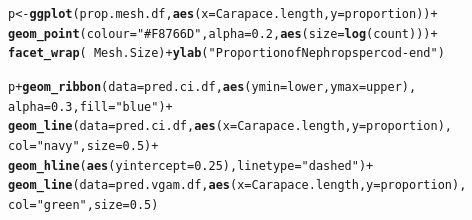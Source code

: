 \documentclass[12pt]{article}\usepackage[]{graphicx}\usepackage[]{color}
\makeatletter
\newcommand{\hlnum}[1]{\textcolor[rgb]{0.686,0.059,0.569}{#1}}%
\newcommand{\hlstr}[1]{\textcolor[rgb]{0.192,0.494,0.8}{#1}}%
\newcommand{\hlopt}[1]{\textcolor[rgb]{0,0,0}{#1}}%
\newcommand{\hlstd}[1]{\textcolor[rgb]{0.345,0.345,0.345}{#1}}%
\newcommand{\hlkwb}[1]{\textcolor[rgb]{0.69,0.353,0.396}{#1}}%
\newcommand{\hlkwc}[1]{\textcolor[rgb]{0.333,0.667,0.333}{#1}}%
\newcommand{\hlkwd}[1]{\textcolor[rgb]{0.737,0.353,0.396}{\textbf{#1}}}%
\newenvironment{kframe}{%
 \def\at@end@of@kframe{}%
 \ifinner\ifhmode%
  \def\at@end@of@kframe{\end{minipage}}%
  \begin{minipage}{\columnwidth}%
 \fi\fi%
 \def\FrameCommand##1{\hskip\@totalleftmargin \hskip-\fboxsep
 \colorbox{shadecolor}{##1}\hskip-\fboxsep
     \hskip-\linewidth \hskip-\@totalleftmargin \hskip\columnwidth}%
 \MakeFramed {\advance\hsize-\width
   \@totalleftmargin\z@ \linewidth\hsize
   \@setminipage}}%
 {\par\unskip\endMakeFramed%
 \at@end@of@kframe}
\newenvironment{knitrout}{}{} %
\makeatother
\begin{document}
\begin{knitrout}\footnotesize
{}\color{fgcolor}\begin{kframe}
\begin{alltt}
\hlstd{p} \hlkwb{<-} \hlkwd{ggplot}\hlstd{(prop.mesh.df,} \hlkwd{aes}\hlstd{(}\hlkwc{x} \hlstd{= Carapace.length,} \hlkwc{y} \hlstd{= proportion))} \hlopt{+}
  \hlkwd{geom_point}\hlstd{(}\hlkwc{colour} \hlstd{=} \hlstr{"#F8766D"}\hlstd{,} \hlkwc{alpha} \hlstd{=} \hlnum{0.2}\hlstd{,} \hlkwd{aes}\hlstd{(}\hlkwc{size} \hlstd{=} \hlkwd{log}\hlstd{(count)))} \hlopt{+}
\hlkwd{facet_wrap}\hlstd{(}\hlopt{~} \hlstd{Mesh.Size)} \hlopt{+} \hlkwd{ylab}\hlstd{(}\hlstr{"Proportion of Nephrops per cod-end"}\hlstd{)}

\hlstd{p} \hlopt{+} \hlkwd{geom_ribbon}\hlstd{(}\hlkwc{data}\hlstd{=pred.ci.df,} \hlkwd{aes}\hlstd{(}\hlkwc{ymin} \hlstd{= lower,} \hlkwc{ymax} \hlstd{= upper),}
                \hlkwc{alpha}\hlstd{=}\hlnum{0.3}\hlstd{,} \hlkwc{fill} \hlstd{=} \hlstr{"blue"}\hlstd{)} \hlopt{+}
  \hlkwd{geom_line}\hlstd{(}\hlkwc{data} \hlstd{= pred.ci.df,} \hlkwd{aes}\hlstd{(}\hlkwc{x} \hlstd{= Carapace.length,} \hlkwc{y} \hlstd{= proportion),}
            \hlkwc{col} \hlstd{=} \hlstr{"navy"}\hlstd{,} \hlkwc{size} \hlstd{=} \hlnum{0.5}\hlstd{)} \hlopt{+}
  \hlkwd{geom_hline}\hlstd{(}\hlkwd{aes}\hlstd{(}\hlkwc{yintercept} \hlstd{=} \hlnum{0.25}\hlstd{),} \hlkwc{linetype} \hlstd{=} \hlstr{"dashed"}\hlstd{)} \hlopt{+}
  \hlkwd{geom_line}\hlstd{(}\hlkwc{data} \hlstd{= pred.vgam.df,} \hlkwd{aes}\hlstd{(}\hlkwc{x} \hlstd{= Carapace.length,} \hlkwc{y} \hlstd{= proportion),}
            \hlkwc{col} \hlstd{=} \hlstr{"green"}\hlstd{,} \hlkwc{size} \hlstd{=} \hlnum{0.5}\hlstd{)}
\end{alltt}
\end{kframe}\begin{figure}

\end{figure}
\end{knitrout}
\end{document}

